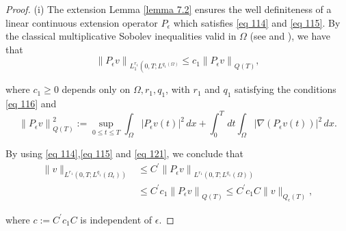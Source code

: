\begin{proof}
(i) The extension Lemma \eqref{lemma 7.2} ensures the well definiteness of a linear continuous extension operator $P_{\epsilon}$ which satisfies \eqref{eq 114} and \eqref{eq 115}. By the classical multiplicative Sobolev inequalities valid in $\Omega$ (see \cite{Ladyzenskaja_Solonnikov_Uralceva_1968} and \cite{Nittka_2011}), we have that
\begin{equation}
  \left\|P_{\epsilon} v\right\|_{L_{1}^{r_{1}}\left(0, T ; L^{q_{1}(\Omega)}\right.} \leq c_{1}\left\|P_{\epsilon} v\right\|_{Q(T)},
\label{eq 121}\end{equation}


where $c_{1} \geq 0$ depends only on $\Omega, r_{1}, q_{1}$, with $r_{1}$ and $q_{1}$ satisfying the conditions \eqref{eq 116} and
\begin{equation}
  \left\|P_{\epsilon} v\right\|_{Q(T)}^{2}:=\sup _{0 \leq t \leq T} \int_{\Omega}\left|P_{\epsilon} v(t)\right|^{2} \, d  x+\int_{0}^{T} \, d  t \int_{\Omega}\left|\nabla\left(P_{\epsilon} v(t)\right)\right|^{2} \, d  x.
\label{eq 122}\end{equation}

By using \eqref{eq 114},\eqref{eq 115} and \eqref{eq 121}, we conclude that
\begin{equation}
  \begin{aligned}
\|v\|_{L^{r_{1}}\left(0, T ; L^{q_{1}}\left(\Omega_{\epsilon}\right)\right)} & \leq C^{\prime}\left\|P_{\epsilon} v\right\|_{L^{r_{1}}\left(0, T ; L^{q_{1}}(\Omega)\right)} \\
& \leq C^{\prime} c_{1}\left\|P_{\epsilon} v\right\|_{Q(T)} \leq C^{\prime} c_{1} C\|v\|_{Q_{\epsilon}(T)},
\end{aligned}
\label{eq 123}\end{equation}


where $c:=C^{\prime} c_{1} C$ is independent of $\epsilon$.


\end{proof}
